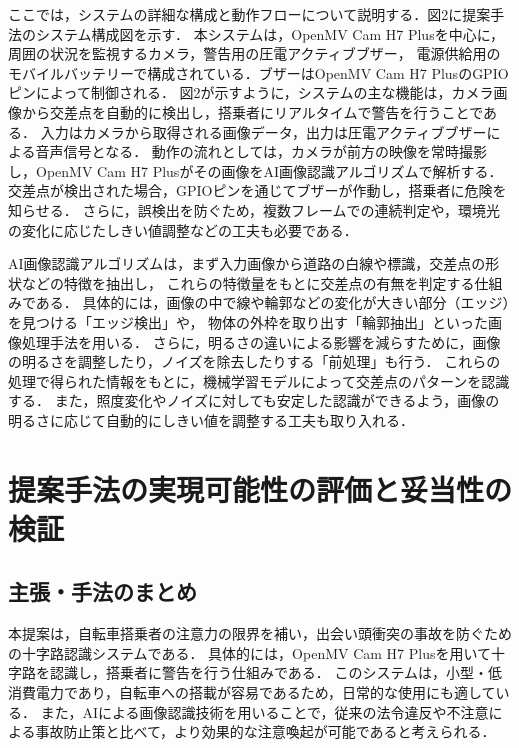 \documentclass[uplatex,dvipdfmx]{jsarticle}
\begin{document}
ここでは，システムの詳細な構成と動作フローについて説明する．図2に提案手法のシステム構成図を示す．
本システムは，OpenMV Cam H7 Plusを中心に，周囲の状況を監視するカメラ，警告用の圧電アクティブブザー，
電源供給用のモバイルバッテリーで構成されている．ブザーはOpenMV Cam H7 PlusのGPIOピンによって制御される．
図2が示すように，システムの主な機能は，カメラ画像から交差点を自動的に検出し，搭乗者にリアルタイムで警告を行うことである．
入力はカメラから取得される画像データ，出力は圧電アクティブブザーによる音声信号となる．
動作の流れとしては，カメラが前方の映像を常時撮影し，OpenMV Cam H7 Plusがその画像をAI画像認識アルゴリズムで解析する．
交差点が検出された場合，GPIOピンを通じてブザーが作動し，搭乗者に危険を知らせる．
さらに，誤検出を防ぐため，複数フレームでの連続判定や，環境光の変化に応じたしきい値調整などの工夫も必要である．
\par
AI画像認識アルゴリズムは，まず入力画像から道路の白線や標識，交差点の形状などの特徴を抽出し，
これらの特徴量をもとに交差点の有無を判定する仕組みである．
具体的には，画像の中で線や輪郭などの変化が大きい部分（エッジ）を見つける「エッジ検出」や，
物体の外枠を取り出す「輪郭抽出」といった画像処理手法を用いる．
さらに，明るさの違いによる影響を減らすために，画像の明るさを調整したり，ノイズを除去したりする「前処理」も行う．
これらの処理で得られた情報をもとに，機械学習モデルによって交差点のパターンを認識する．
また，照度変化やノイズに対しても安定した認識ができるよう，画像の明るさに応じて自動的にしきい値を調整する工夫も取り入れる．
\par

\vspace{3cm}

\section{提案手法の実現可能性の評価と妥当性の検証}

\subsection{主張・手法のまとめ}
\indent
本提案は，自転車搭乗者の注意力の限界を補い，出会い頭衝突の事故を防ぐための十字路認識システムである．
具体的には，OpenMV Cam H7 Plusを用いて十字路を認識し，搭乗者に警告を行う仕組みである．
このシステムは，小型・低消費電力であり，自転車への搭載が容易であるため，日常的な使用にも適している．
また，AIによる画像認識技術を用いることで，従来の法令違反や不注意による事故防止策と比べて，より効果的な注意喚起が可能であると考えられる．
\par
\end{document}
